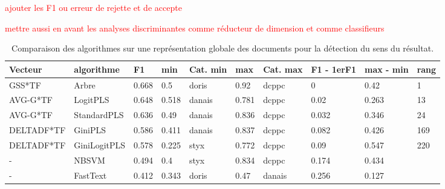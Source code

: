 \begin{table}[!htb]	
	\scriptsize
	
	\textcolor{red}{ajouter les F1 ou erreur de rejette et de accepte}
	
	\textcolor{red}{mettre aussi en avant les analyses discriminantes comme réducteur de dimension et comme classifieurs}
	
	\centering
	\begin{tabular}{|l|l|l|l|l|l|l|l|l|l|}
		\hline
		\textbf{Vecteur} & \textbf{algorithme} & \textbf{F1} & \textbf{min} & \textbf{Cat. min} & \textbf{max} & \textbf{Cat. max} & \textbf{F1 - 1erF1} & \textbf{max - min} & \textbf{rang} \\ \hline
		GSS*TF           & Arbre               & 0.668       & 0.5          & doris             & 0.92         & dcppc             & 0                   & 0.42               & 1             \\ \hline
		AVG-G*TF         & LogitPLS            & 0.648       & 0.518        & danais            & 0.781        & dcppc             & 0.02                & 0.263              & 13            \\ \hline
		AVG-G*TF         & StandardPLS         & 0.636       & 0.49         & danais            & 0.836        & dcppc             & 0.032               & 0.346              & 24            \\ \hline
		DELTADF*TF       & GiniPLS             & 0.586       & 0.411        & danais            & 0.837        & dcppc             & 0.082               & 0.426              & 169           \\ \hline
		DELTADF*TF       & GiniLogitPLS        & 0.578       & 0.225        & styx              & 0.772        & dcppc             & 0.09                & 0.547              & 220           \\ \hline
		-                & NBSVM               & 0.494       & 0.4          & styx              & 0.834        & dcppc             & 0.174               & 0.434              &               \\ \hline
		-                & FastText            & 0.412       & 0.343        & doris             & 0.47         & danais            & 0.256               & 0.127              &               \\ \hline
	\end{tabular}
\caption{Comparaison des algorithmes sur une représentation globale des documents pour la détection du sens du résultat.}\label{tab:sensrst:global}
\end{table}

